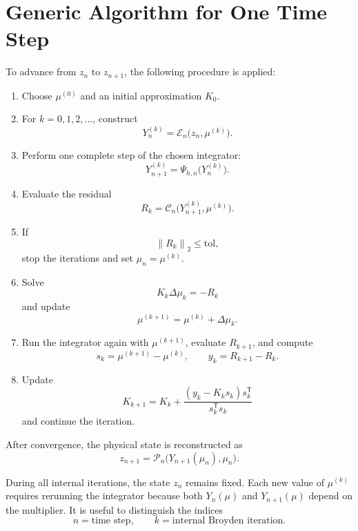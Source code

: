 \documentclass[11pt,a4paper]{article}
\newcommand{\norm}[1]{\left\lVert #1\right\rVert}
\begin{document}
\section{Generic Algorithm for One Time Step}

To advance from $z_n$ to $z_{n+1}$, the following procedure is applied:

\begin{enumerate}
    \item Choose $\mu^{(0)}$ and an initial approximation $K_0$.

    \item For $k=0,1,2,\ldots$, construct
    \[
        Y_n^{(k)}=\mathcal E_n\bigl(z_n,\mu^{(k)}\bigr).
    \]

    \item Perform one complete step of the chosen integrator:
    \[
        Y_{n+1}^{(k)}=\Psi_{h,n}\bigl(Y_n^{(k)}\bigr).
    \]

    \item Evaluate the residual
    \[
        R_k
        =\mathcal C_n\bigl(Y_{n+1}^{(k)},\mu^{(k)}\bigr).
    \]

    \item If
    \[
        \norm{R_k}_2\leq\mathrm{tol},
    \]
    stop the iterations and set $\mu_n=\mu^{(k)}$.

    \item Solve
    \[
        K_k\Delta\mu_k=-R_k
    \]
    and update
    \[
        \mu^{(k+1)}=\mu^{(k)}+\Delta\mu_k.
    \]

    \item Run the integrator again with $\mu^{(k+1)}$, evaluate $R_{k+1}$,
    and compute
    \[
        s_k=\mu^{(k+1)}-\mu^{(k)},
        \qquad
        y_k=R_{k+1}-R_k.
    \]

    \item Update
    \[
        K_{k+1}
        =K_k+
        \frac{(y_k-K_ks_k)s_k^{\mathsf T}}
             {s_k^{\mathsf T}s_k}
    \]
    and continue the iteration.
\end{enumerate}

After convergence, the physical state is reconstructed as
\[
    z_{n+1}
    =\mathcal P_n\bigl(Y_{n+1}(\mu_n),\mu_n\bigr).
\]

During all internal iterations, the state $z_n$ remains fixed. Each new value
of $\mu^{(k)}$ requires rerunning the integrator because both $Y_n(\mu)$ and
$Y_{n+1}(\mu)$ depend on the multiplier. It is useful to distinguish the
indices
\[
    \boxed{
    n=\text{time step},
    \qquad
    k=\text{internal Broyden iteration}.}
\]
\end{document}
